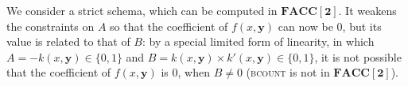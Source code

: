 \documentclass[11pt, oneside]{article}
\newcommand{\fun}[1]{\mathsf{#1}}
\newcommand{\Nat}{\mathbb{N}}
\newcommand{\FACC}{\mathbf{FACC[2]}}
\newcommand{\tu}[1]{\mathbf{#1}}
\newtheorem{lemma}{Lemma}
\theoremstyle{definition}
\newtheorem{remark}{Remark}
\newcommand{\ODEACC}{\ell\text{-ODE}_{\text{FACC[2]}}}
\begin{document}
\begin{toappendix}











We consider a strict schema, which can be computed in $\FACC$.
%
It weakens the constraints on $A$ so that %
the coefficient of $f(x, \tu y)$ can now be 0, but its value is related to that of $B$:
%
by a special limited form of linearity, in which $A=-k(x,\tu y)\in \{0,1\}$ and $B=k(x, \tu y)\times k'(x, \tu y)\in \{0,1\}$, it is not possible that the coefficient of $f(x,\tu y)$ is 0, when $B\neq 0$ (\textsc{bcount} is not in $\FACC$).


\end{toappendix}
\end{document}
